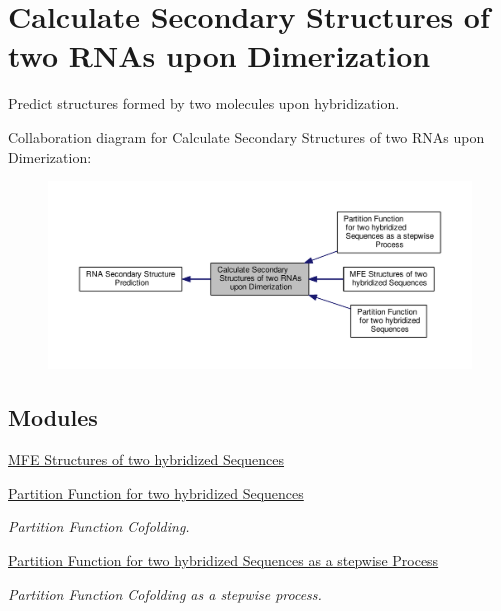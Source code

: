 \hypertarget{group__cofold}{\section{Calculate Secondary Structures of two R\-N\-As upon Dimerization}
\label{group__cofold}
}


Predict structures formed by two molecules upon hybridization.  


Collaboration diagram for Calculate Secondary Structures of two R\-N\-As upon Dimerization\-:
\nopagebreak
\begin{figure}[H]
\begin{center}
\leavevmode
\includegraphics[width=350pt]{group__cofold}
\end{center}
\end{figure}
\subsection*{Modules}
\begin{DoxyCompactItemize}
\item 
\hyperlink{group__mfe__cofold}{M\-F\-E Structures of two hybridized Sequences}
\item 
\hyperlink{group__pf__cofold}{Partition Function for two hybridized Sequences}
\begin{DoxyCompactList}\small\item\em Partition Function Cofolding. \end{DoxyCompactList}\item 
\hyperlink{group__up__cofold}{Partition Function for two hybridized Sequences as a stepwise Process}
\begin{DoxyCompactList}\small\item\em Partition Function Cofolding as a stepwise process. \end{DoxyCompactList}\end{DoxyCompactItemize}



